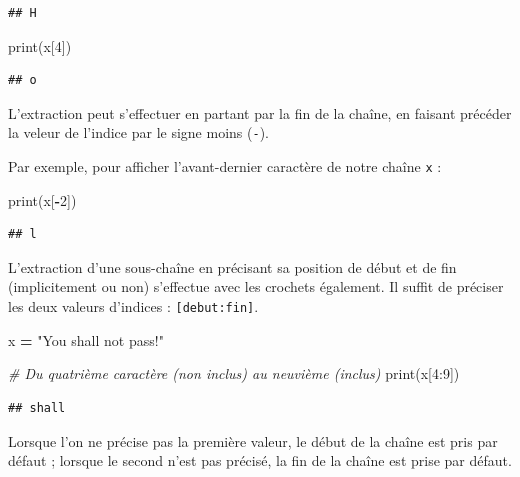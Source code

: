 \documentclass[12pt,]{book}
\newenvironment{Shaded}{\begin{snugshade}}{\end{snugshade}}
\newcommand{\DecValTok}[1]{\textcolor[rgb]{0.00,0.00,0.81}{#1}}
\newcommand{\StringTok}[1]{\textcolor[rgb]{0.31,0.60,0.02}{#1}}
\newcommand{\CommentTok}[1]{\textcolor[rgb]{0.56,0.35,0.01}{\textit{#1}}}
\newcommand{\OperatorTok}[1]{\textcolor[rgb]{0.81,0.36,0.00}{\textbf{#1}}}
\newcommand{\BuiltInTok}[1]{#1}
\newcommand{\NormalTok}[1]{#1}
\numberwithin{equation}{section}
\numberwithin{countremarque}{section}
\begin{document}
\begin{lstlisting}
## H
\end{lstlisting}

\begin{Shaded}
\begin{Highlighting}[]
\BuiltInTok{print}\NormalTok{(x[}\DecValTok{4}\NormalTok{])}
\end{Highlighting}
\end{Shaded}

\begin{lstlisting}
## o
\end{lstlisting}

L'extraction peut s'effectuer en partant par la fin de la chaîne, en
faisant précéder la veleur de l'indice par le signe moins (\texttt{-}).

Par exemple, pour afficher l'avant-dernier caractère de notre chaîne
\texttt{x} :

\begin{Shaded}
\begin{Highlighting}[]
\BuiltInTok{print}\NormalTok{(x[}\OperatorTok{-}\DecValTok{2}\NormalTok{])}
\end{Highlighting}
\end{Shaded}

\begin{lstlisting}
## l
\end{lstlisting}

L'extraction d'une sous-chaîne en précisant sa position de début et de
fin (implicitement ou non) s'effectue avec les crochets également. Il
suffit de préciser les deux valeurs d'indices :
\texttt{{[}debut:fin{]}}.

\begin{Shaded}
\begin{Highlighting}[]
\NormalTok{x }\OperatorTok{=} \StringTok{"You shall not pass!"}

\CommentTok{# Du quatrième caractère (non inclus) au neuvième (inclus)}
\BuiltInTok{print}\NormalTok{(x[}\DecValTok{4}\NormalTok{:}\DecValTok{9}\NormalTok{])}
\end{Highlighting}
\end{Shaded}

\begin{lstlisting}
## shall
\end{lstlisting}

Lorsque l'on ne précise pas la première valeur, le début de la chaîne
est pris par défaut ; lorsque le second n'est pas précisé, la fin de la
chaîne est prise par défaut.
\end{document}
